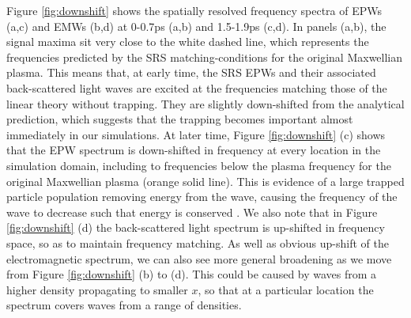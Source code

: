 Figure \ref{fig:downshift} shows the spatially resolved frequency spectra of
EPWs (a,c) and EMWs (b,d) at 0-0.7ps
(a,b) and 1.5-1.9ps (c,d). In panels (a,b), the signal maxima sit very close to
the white dashed line, which represents the frequencies predicted by the SRS
matching-conditions for the original Maxwellian plasma. This means that, at
early time, the SRS EPWs and their associated back-scattered light
waves are excited at the frequencies matching those of the linear theory
without trapping.
They are slightly down-shifted from the analytical prediction, which suggests
that the trapping
becomes important almost immediately in our simulations.
At later time, Figure \ref{fig:downshift} (c) shows that the EPW spectrum is
down-shifted in frequency
at every location in the simulation domain, including to frequencies below the
plasma frequency for the original Maxwellian plasma (orange solid line).
This is evidence of a large trapped particle population removing energy from
the wave, causing the frequency of the wave
to decrease such that energy is conserved \cite{Morales1972}. We also note that
in Figure \ref{fig:downshift} (d) the back-scattered light spectrum is
up-shifted in frequency space, so as to maintain frequency matching. As well as obvious up-shift of the electromagnetic spectrum, we can also see more general broadening as we move from Figure \ref{fig:downshift} (b) to (d). This could be caused by waves from a higher density propagating to smaller $x$, so that at a particular location the spectrum covers waves from a range of densities.



